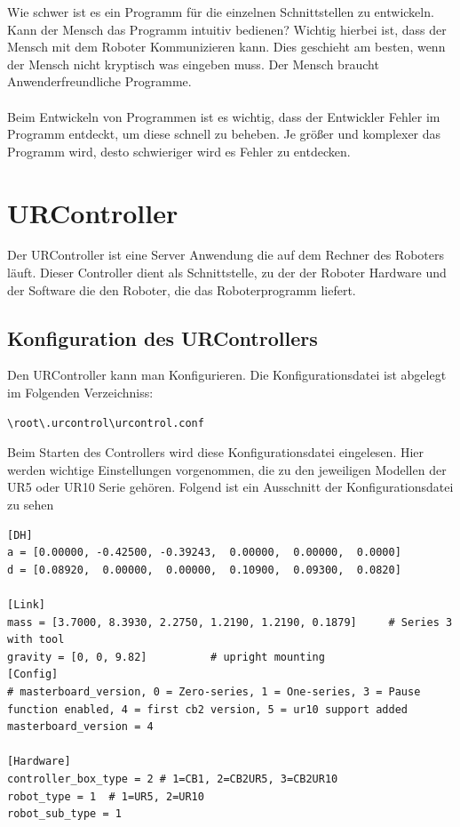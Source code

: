 Wie schwer ist es ein Programm für die einzelnen Schnittstellen zu entwickeln.
Kann der Mensch das Programm intuitiv bedienen? Wichtig hierbei ist, dass der Mensch mit dem Roboter Kommunizieren kann. Dies geschieht am besten, wenn der Mensch nicht kryptisch was eingeben muss. Der Mensch braucht Anwenderfreundliche Programme.
\\\\
Beim Entwickeln von Programmen ist es wichtig, dass der Entwickler Fehler im Programm entdeckt, um diese schnell zu beheben.
Je größer und komplexer das Programm wird, desto schwieriger wird es Fehler zu entdecken. 

\section{URController}
\label{sec:ur_control_gru}

Der URController ist eine Server Anwendung die auf dem Rechner des Roboters läuft. 
Dieser Controller dient als Schnittstelle, zu der der Roboter Hardware und der Software die den Roboter, die das Roboterprogramm liefert. 

\subsection{Konfiguration des URControllers}
\label{urcontrol_rci_gru}

Den URController kann man Konfigurieren. Die Konfigurationsdatei ist abgelegt im Folgenden Verzeichniss:
\begin{lstlisting}
\root\.urcontrol\urcontrol.conf
\end{lstlisting}

Beim Starten des Controllers wird diese Konfigurationsdatei eingelesen.
Hier werden wichtige Einstellungen vorgenommen, die zu den jeweiligen Modellen der UR5 oder UR10 Serie gehören. Folgend ist ein Ausschnitt der Konfigurationsdatei zu sehen
\\
\begin{lstlisting}[caption={Ausschnitt aus der Datei urcontrol.conf zur vorkonfigurierung des UR5 Roboters}, label=lst:ur5_conf ,captionpos=b]
[DH]
a = [0.00000, -0.42500, -0.39243,  0.00000,  0.00000,  0.0000]
d = [0.08920,  0.00000,  0.00000,  0.10900,  0.09300,  0.0820]

[Link]
mass = [3.7000, 8.3930, 2.2750, 1.2190, 1.2190, 0.1879]     # Series 3 with tool
gravity = [0, 0, 9.82]          # upright mounting
[Config]
# masterboard_version, 0 = Zero-series, 1 = One-series, 3 = Pause function enabled, 4 = first cb2 version, 5 = ur10 support added
masterboard_version = 4

[Hardware]
controller_box_type = 2 # 1=CB1, 2=CB2UR5, 3=CB2UR10
robot_type = 1  # 1=UR5, 2=UR10
robot_sub_type = 1
\end{lstlisting}

